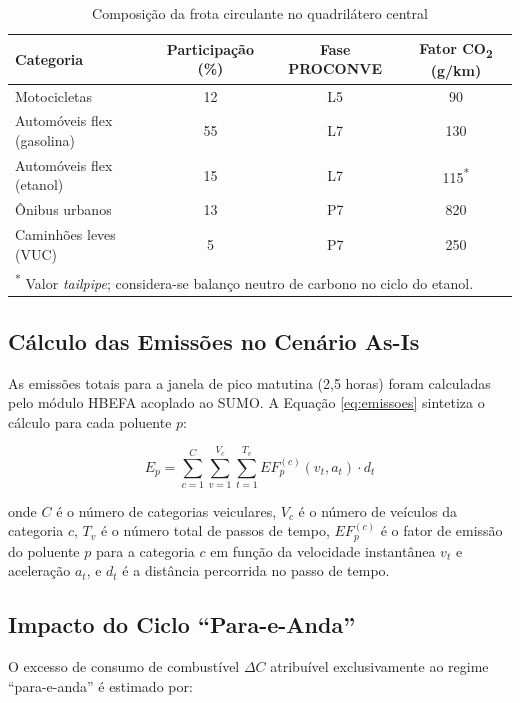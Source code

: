 \documentclass[12pt,a4paper,oneside]{abntex2}
\begin{document}
\begin{table}[H]
\centering
\caption{Composição da frota circulante no quadrilátero central}
\label{tab:frota}
\begin{tabularx}{\textwidth}{l c c c}
\toprule
\textbf{Categoria} & \textbf{Participação (\%)} & \textbf{Fase PROCONVE} & \textbf{Fator CO\textsubscript{2} (g/km)} \\
\midrule
Motocicletas & 12 & L5 & 90 \\
Automóveis flex (gasolina) & 55 & L7 & 130 \\
Automóveis flex (etanol) & 15 & L7 & 115\textsuperscript{*} \\
Ônibus urbanos & 13 & P7 & 820 \\
Caminhões leves (VUC) & 5 & P7 & 250 \\
\bottomrule
\multicolumn{4}{l}{\small \textsuperscript{*} Valor \textit{tailpipe}; considera-se balanço neutro de carbono no ciclo do etanol.} \\
\end{tabularx}
\end{table}

\subsection{Cálculo das Emissões no Cenário As-Is}

As emissões totais para a janela de pico matutina (2,5 horas) foram calculadas pelo módulo HBEFA acoplado ao SUMO. A Equação \ref{eq:emissoes} sintetiza o cálculo para cada poluente $p$:

\begin{equation}
E_p = \sum_{c=1}^{C} \sum_{v=1}^{V_c} \sum_{t=1}^{T_v} EF_p^{(c)}(v_t, a_t) \cdot d_t
\label{eq:emissoes}
\end{equation}

onde $C$ é o número de categorias veiculares, $V_c$ é o número de veículos da categoria $c$, $T_v$ é o número total de passos de tempo, $EF_p^{(c)}$ é o fator de emissão do poluente $p$ para a categoria $c$ em função da velocidade instantânea $v_t$ e aceleração $a_t$, e $d_t$ é a distância percorrida no passo de tempo.

\subsection{Impacto do Ciclo ``Para-e-Anda''}

O excesso de consumo de combustível $\Delta C$ atribuível exclusivamente ao regime ``para-e-anda'' é estimado por:
\end{document}
